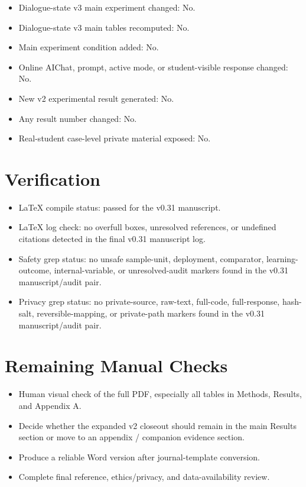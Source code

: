 \documentclass[11pt]{article}
\begin{document}
\begin{itemize}
  \item Dialogue-state v3 main experiment changed: No.
  \item Dialogue-state v3 main tables recomputed: No.
  \item Main experiment condition added: No.
  \item Online AIChat, prompt, active mode, or student-visible response changed: No.
  \item New v2 experimental result generated: No.
  \item Any result number changed: No.
  \item Real-student case-level private material exposed: No.
\end{itemize}

\section{Verification}

\begin{itemize}
  \item LaTeX compile status: passed for the v0.31 manuscript.
  \item LaTeX log check: no overfull boxes, unresolved references, or undefined citations detected in the final v0.31 manuscript log.
  \item Safety grep status: no unsafe sample-unit, deployment, comparator, learning-outcome, internal-variable, or unresolved-audit markers found in the v0.31 manuscript/audit pair.
  \item Privacy grep status: no private-source, raw-text, full-code, full-response, hash-salt, reversible-mapping, or private-path markers found in the v0.31 manuscript/audit pair.
\end{itemize}

\section{Remaining Manual Checks}

\begin{itemize}
  \item Human visual check of the full PDF, especially all tables in Methods, Results, and Appendix A.
  \item Decide whether the expanded v2 closeout should remain in the main Results section or move to an appendix / companion evidence section.
  \item Produce a reliable Word version after journal-template conversion.
  \item Complete final reference, ethics/privacy, and data-availability review.
\end{itemize}
\end{document}
